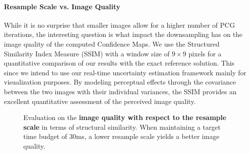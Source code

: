 \paragraph{Resample Scale vs. Image Quality}
While it is no surprise that smaller images allow for a higher number of PCG iterations, the interesting question is what impact the downsampling has on the image quality of the computed Confidence Maps.
We use the Structured Similarity Index Measure (SSIM) with a window size of $9 \times 9$ pixels \cite{Wang:2004:SSIM} for a quantitative comparison of our results with the exact reference solution.
This  since we intend to use our real-time uncertainty estimation framework mainly for visualization purposes.
By modeling perceptual effects through  the covariance between the two images with their individual variances, the SSIM provides an excellent quantitative assessment of the perceived image quality.

\begin{figure}[ht]
	\centering
	\caption{
		Evaluation on the \textbf{image quality with respect to the resample scale} in terms of structural similarity.
		When maintaining a target time budget of 30ms, a lower resample scale yields a better image quality.
	}
	\label{fig:cudacm:evaluation-30ms-error}
\end{figure}

